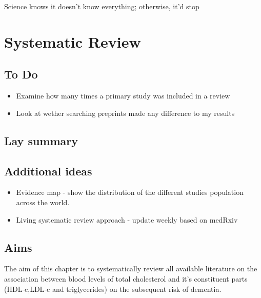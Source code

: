 \documentclass[a4paper, twoside]{templates/ociamthesis}
\providecommand{\tightlist}{%
  \setlength{\itemsep}{0pt}\setlength{\parskip}{0pt}}
\begin{document}
\begin{savequote}
Science knows it doesn't know everything; otherwise, it'd stop
\end{savequote}

\hypertarget{sys-rev-heading}{%
\chapter{Systematic Review}\label{sys-rev-heading}}

\minitoc 

\hypertarget{to-do}{%
\section{To Do}\label{to-do}}

\begin{itemize}
\tightlist
\item
  Examine how many times a primary study was included in a review\\
\item
  Look at wether searching preprints made any difference to my results
\end{itemize}

\hypertarget{lay-summary-1}{%
\section{Lay summary}\label{lay-summary-1}}

\hypertarget{additional-ideas-1}{%
\section{Additional ideas}\label{additional-ideas-1}}

\begin{itemize}
\tightlist
\item
  Evidence map - show the distribution of the different studies population across the world.
\item
  Living systematic review approach - update weekly based on medRxiv
\end{itemize}

\hypertarget{aims}{%
\section{Aims}\label{aims}}

The aim of this chapter is to systematically review all available literature on the association between blood levels of total cholesterol and it's constituent parts (HDL-c,LDL-c and triglycerides) on the subsequent risk of dementia.
\end{document}
